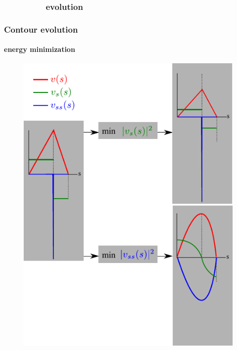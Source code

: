 \subsubsection{\ \ \ \ \ \ \ \ \   evolution}
\begin{frame}
\frametitle{Contour evolution}
\framesubtitle{energy minimization}
\logoCSIPCPL\mypagenum
	\begin{figure}
		\includegraphics[height=0.8\textheight]{figs/TRK_contours.pdf}
	\end{figure}
\end{frame}


